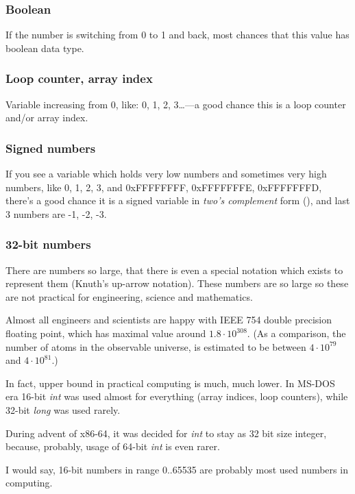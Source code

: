 \subsubsection{Boolean}

If the number is switching from 0 to 1 and back, most chances that this value has boolean data type.

\subsubsection{Loop counter, array index}

Variable increasing from 0, like: 0, 1, 2, 3\dots---a good chance this is a loop counter and/or array index.

\subsubsection{Signed numbers}

If you see a variable which holds very low numbers and sometimes very high numbers,
like 0, 1, 2, 3, and 0xFFFFFFFF, 0xFFFFFFFE, 0xFFFFFFFD,
there's a good chance it is a signed variable in \emph{two's complement} form (),
and last 3 numbers are -1, -2, -3.

\subsubsection{32-bit numbers}

There are numbers so large,
that there is even a special notation which exists to represent them (Knuth's up-arrow notation).
These numbers are so large so these are not practical for engineering, science and mathematics.

Almost all engineers and scientists are happy with IEEE 754 double precision floating point, which has maximal
value around $1.8 \cdot 10^{308}$.
(As a comparison, the number of atoms in the observable universe, is estimated to be between
$4 \cdot 10^{79}$ and $4 \cdot 10^{81}$.)

In fact, upper bound in practical computing is much, much lower.
In MS-DOS era 16-bit \emph{int} was used almost for everything (array indices, loop counters),
while 32-bit \emph{long} was used rarely.

During advent of x86-64, it was decided for \emph{int} to stay as 32 bit size integer, because, probably,
usage of 64-bit \emph{int} is even rarer.

I would say, 16-bit numbers in range 0..65535 are probably most used numbers in computing.

